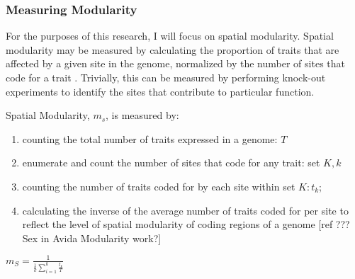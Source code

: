 \subsubsection{Measuring Modularity}

For the purposes of this research, I will focus on spatial modularity. Spatial modularity may be measured by calculating the proportion of traits that are affected by a given site in the genome, normalized by the number of sites that code for a trait \cite{misevic_sexual_2006}. Trivially, this can be measured by performing knock-out experiments to identify the sites that contribute to particular function.

Spatial Modularity, $m_s$, is measured by:

\begin{enumerate}
\item counting the total number of traits expressed in a genome: $T$
\item enumerate and count the number of sites that code for any trait: set $K, k$
\item counting the number of traits coded for by each site within set $K: t_k$;
\item calculating the inverse of the average number of traits coded for per site to reflect the level of spatial modularity of coding regions of a genome [ref ??? Sex in Avida Modularity work?]
\end{enumerate}

$m_{S} =  \frac{1}{\frac{1}{k} {\sum_{i=1}^{k} \frac{t_{k}}{T}}}$ 


